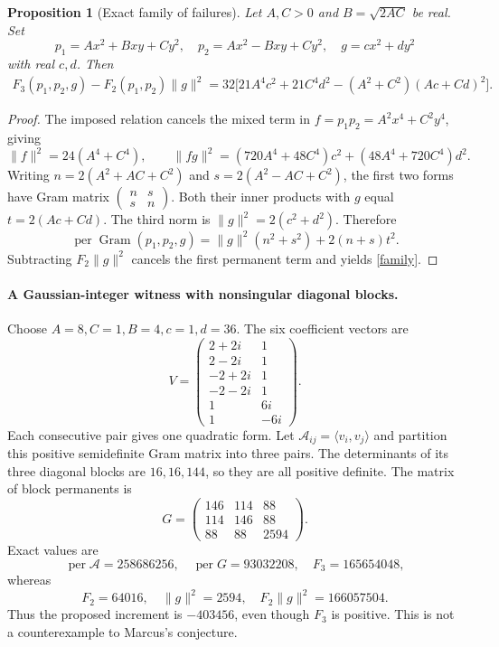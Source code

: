 \documentclass[11pt]{article}
\newtheorem{proposition}{Proposition}
\newcommand{\per}{\operatorname{per}}
\begin{document}
\begin{proposition}[Exact family of failures]
Let $A,C>0$ and $B=\sqrt{2AC}$ be real. Set
\[
 p_1=Ax^2+Bxy+Cy^2,\quad
 p_2=Ax^2-Bxy+Cy^2,\quad
 g=cx^2+dy^2
\]
with real $c,d$. Then
\begin{align}\label{family}
 F_3(p_1,p_2,g)-F_2(p_1,p_2)\|g\|^2
 =32\bigl[21A^4c^2+21C^4d^2
             -(A^2+C^2)(Ac+Cd)^2\bigr].
\end{align}
\end{proposition}
\begin{proof}
The imposed relation cancels the mixed term in
$f=p_1p_2=A^2x^4+C^2y^4$, giving
\[
 \|f\|^2=24(A^4+C^4),\qquad
 \|fg\|^2=(720A^4+48C^4)c^2+(48A^4+720C^4)d^2.
\]
Writing $n=2(A^2+AC+C^2)$ and $s=2(A^2-AC+C^2)$, the first
two forms have Gram matrix $\left(\begin{smallmatrix}n&s\\s&n\end{smallmatrix}\right)$.
Both their inner products with $g$ equal $t=2(Ac+Cd)$.
The third norm is $\|g\|^2=2(c^2+d^2)$. Therefore
\[
 \per\operatorname{Gram}(p_1,p_2,g)
 =\|g\|^2(n^2+s^2)+2(n+s)t^2.
\]
Subtracting $F_2\|g\|^2$ cancels the first permanent term and yields
\eqref{family}.
\end{proof}

\paragraph{A Gaussian-integer witness with nonsingular diagonal blocks.}
Choose $A=8,C=1,B=4,c=1,d=36$. The six coefficient vectors are
\[
 V=\begin{pmatrix}
 2+2i&1\\2-2i&1\\-2+2i&1\\-2-2i&1\\1&6i\\1&-6i
 \end{pmatrix}.
\]
Each consecutive pair gives one quadratic form. Let
$\mathcal A_{ij}=\langle v_i,v_j\rangle$ and partition this positive
semidefinite Gram matrix into three pairs. The determinants of its three
diagonal blocks are $16,16,144$, so they are all positive definite.
The matrix of block permanents is
\[
 G=\begin{pmatrix}146&114&88\\114&146&88\\88&88&2594\end{pmatrix}.
\]
Exact values are
\[
 \per\mathcal A=258686256,\quad \per G=93032208,\quad
 F_3=165654048,
\]
whereas
\[
 F_2=64016,\quad\|g\|^2=2594,\quad
 F_2\|g\|^2=166057504.
\]
Thus the proposed increment is $-403456$, even though $F_3$ is positive.
This is not a counterexample to Marcus's conjecture.
\end{document}

